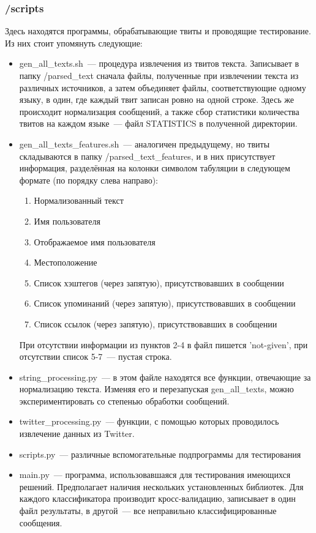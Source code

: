 \documentclass[a4paper, 14pt]{article}
\begin{document}
			\subsubsection{/scripts}
			Здесь находятся программы, обрабатывающие твиты и проводящие тестирование. Из них стоит упомянуть следующие:
			\begin{itemize}
				\item gen_all_texts.sh~--- процедура извлечения из твитов текста. Записывает в папку /parsed\_text сначала файлы, полученные при извлечении текста из различных источников, а затем объединяет файлы, соответствующие одному языку, в один, где каждый твит записан ровно на одной строке. Здесь же происходит нормализация сообщений, а также сбор статистики количества твитов на каждом языке~--- файл STATISTICS в полученной директории.
				\item gen_all_texts_features.sh~--- аналогичен предыдущему, но твиты складываются в папку /parsed\_text\_features, и в них присутствует информация, разделённая на колонки символом табуляции в следующем формате (по порядку слева направо):
				\begin{enumerate}
					\item Нормализованный текст
					\item Имя пользователя
					\item Отображаемое имя пользователя
					\item Местоположение
					\item Список хэштегов (через запятую), присутствовавших в сообщении
					\item Список упоминаний (через запятую), присутствовавших в сообщении
					\item Cписок ссылок (через запятую), присутствовавших в сообщении
				\end{enumerate}
				При отсутствии информации из пунктов 2-4 в файл пишется 'not-given', при отсутствии список 5-7~--- пустая строка.
				\item string_processing.py~--- в этом файле находятся все функции, отвечающие за нормализацию текста. Изменяя его и перезапуская gen_all_texts, можно экспериментировать со степенью обработки сообщений.
				\item twitter_processing.py~--- функции, с помощью которых проводилось извлечение данных из Twitter.
				\item scripts.py~--- различные вспомогательные подпрограммы для тестирования
				\item main.py~--- программа, использовавшаяся для тестирования имеющихся решений. Предполагает наличия нескольких установленных библиотек. Для каждого классификатора производит кросс-валидацию, записывает в один файл результаты, в другой~--- все неправильно классифицированные сообщения.
			\end{itemize}
\end{document}
